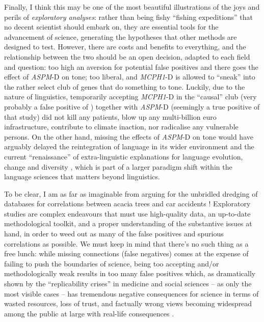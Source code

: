 \documentclass[twoside,onecolumn]{article}
\begin{document}
Finally, I think this may be one of the most beautiful illustrations of the joys and perils of \emph{exploratory analyses}: rather than being fishy ``fishing expeditions'' that no decent scientist should embark on, they are essential tools for the advancement of science, generating the hypotheses that other methods are designed to test.
However, there are costs and benefits to everything, and the relationship between the two should be an open decision, adapted to each field and question: too high an aversion for potential false positives and there goes the effect of \textit{ASPM}-D on tone; too liberal, and \textit{MCPH1}-D is allowed to ``sneak'' into the rather select club of genes that do something to tone.
Luckily, due to the nature of linguistics, temporarily accepting \textit{MCPH1}-D in the ``causal'' club (very probably a false positive of \citealp{dediu_ladd_2007}) together with \textit{ASPM}-D (seemingly a true positive of that study) did not kill any patients, blow up any multi-billion euro infrastructure, contribute to climate inaction, nor radicalise any vulnerable persons.
On the other hand, missing the effects of \textit{ASPM}-D on tone would have arguably delayed the reintegration of language in its wider environment and the current ``renaissance'' of extra-linguistic explanations for language evolution, change and diversity \citep{blasi_human_2019,dediu_language_2017,everett_language_2016,dediu_glossa_2019,lupyan_why_2016}, which is part of a larger paradigm shift within the language sciences that matters beyond linguistics.

To be clear, I am as far as imaginable from arguing for the unbridled dredging of databases for correlations between acacia trees and car accidents \citep{ladd_correlational_2015,roberts_traffic_2013}!
Exploratory studies are complex endeavours that must use high-quality data, an up-to-date methodological toolkit, and a proper understanding of the substantive issues at hand, in order to weed out as many of the false positives and spurious correlations as possible.
We must keep in mind that there’s no such thing as a free lunch: while missing connections (false negatives) comes at the expense of failing to push the boundaries of science, being too accepting and/or methodologically weak results in too many false positives which, as dramatically shown by the ``replicability crises'' in medicine \citep{ioannidis_why_2005} and social sciences – as only the most visible cases – has tremendous negative consequences for science in terms of wasted resources, loss of trust, and factually wrong views becoming widespread among the public at large with real-life consequences \citep{bregman_humankind_2020}.
\end{document}
